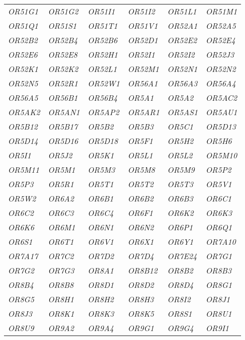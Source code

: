 \begin{longtable}{>{\em}l>{\em}l>{\em}l>{\em}l>{\em}l>{\em}l}
  \rowcolor{black!5} 
  OR51G1 & OR51G2 & OR51I1 & OR51I2 & OR51L1 & OR51M1 \\ 
  \rowcolor{black!10} 
  OR51Q1 & OR51S1 & OR51T1 & OR51V1 & OR52A1 & OR52A5 \\ 
  \rowcolor{black!5} 
  OR52B2 & OR52B4 & OR52B6 & OR52D1 & OR52E2 & OR52E4 \\ 
  \rowcolor{black!10} 
  OR52E6 & OR52E8 & OR52H1 & OR52I1 & OR52I2 & OR52J3 \\ 
  \rowcolor{black!5} 
  OR52K1 & OR52K2 & OR52L1 & OR52M1 & OR52N1 & OR52N2 \\ 
  \rowcolor{black!10} 
  OR52N5 & OR52R1 & OR52W1 & OR56A1 & OR56A3 & OR56A4 \\ 
  \rowcolor{black!5} 
  OR56A5 & OR56B1 & OR56B4 & OR5A1 & OR5A2 & OR5AC2 \\ 
  \rowcolor{black!10} 
  OR5AK2 & OR5AN1 & OR5AP2 & OR5AR1 & OR5AS1 & OR5AU1 \\ 
  \rowcolor{black!5} 
  OR5B12 & OR5B17 & OR5B2 & OR5B3 & OR5C1 & OR5D13 \\ 
  \rowcolor{black!10} 
  OR5D14 & OR5D16 & OR5D18 & OR5F1 & OR5H2 & OR5H6 \\ 
  \rowcolor{black!5} 
  OR5I1 & OR5J2 & OR5K1 & OR5L1 & OR5L2 & OR5M10 \\ 
  \rowcolor{black!10} 
  OR5M11 & OR5M1 & OR5M3 & OR5M8 & OR5M9 & OR5P2 \\ 
  \rowcolor{black!5} 
  OR5P3 & OR5R1 & OR5T1 & OR5T2 & OR5T3 & OR5V1 \\ 
  \rowcolor{black!10} 
  OR5W2 & OR6A2 & OR6B1 & OR6B2 & OR6B3 & OR6C1 \\ 
  \rowcolor{black!5} 
  OR6C2 & OR6C3 & OR6C4 & OR6F1 & OR6K2 & OR6K3 \\ 
  \rowcolor{black!10} 
  OR6K6 & OR6M1 & OR6N1 & OR6N2 & OR6P1 & OR6Q1 \\ 
  \rowcolor{black!5} 
  OR6S1 & OR6T1 & OR6V1 & OR6X1 & OR6Y1 & OR7A10 \\ 
  \rowcolor{black!10} 
  OR7A17 & OR7C2 & OR7D2 & OR7D4 & OR7E24 & OR7G1 \\ 
  \rowcolor{black!5} 
  OR7G2 & OR7G3 & OR8A1 & OR8B12 & OR8B2 & OR8B3 \\ 
  \rowcolor{black!10} 
  OR8B4 & OR8B8 & OR8D1 & OR8D2 & OR8D4 & OR8G1 \\ 
  \rowcolor{black!5} 
  OR8G5 & OR8H1 & OR8H2 & OR8H3 & OR8I2 & OR8J1 \\ 
  \rowcolor{black!10} 
  OR8J3 & OR8K1 & OR8K3 & OR8K5 & OR8S1 & OR8U1 \\ 
  \rowcolor{black!5} 
  OR8U9 & OR9A2 & OR9A4 & OR9G1 & OR9G4 & OR9I1 \\ 

\end{longtable}
